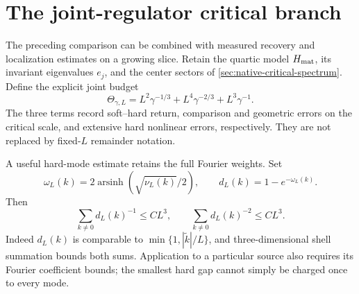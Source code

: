 \documentclass[11pt,oneside,openany]{book}
\theoremstyle{definition}
\theoremstyle{remark}
\begin{document}
\section{The joint-regulator critical branch}
\label{sec:native-joint-regulator}
The preceding comparison can be combined with measured recovery and
localization estimates on a growing slice. Retain the quartic model
$H_{\rm mat}$, its invariant eigenvalues $e_j$, and the center sectors
of \cref{sec:native-critical-spectrum}. Define the explicit joint budget
\begin{equation}
 \Theta_{\gamma,L}
    =L^2\gamma^{-1/3}+L^4\gamma^{-2/3}+L^3\gamma^{-1}.
 \label{eq:native-joint-budget}
\end{equation}
The three terms record soft--hard return, comparison and geometric
errors on the critical scale, and extensive hard nonlinear errors,
respectively. They are not replaced by fixed-$L$ remainder notation.

A useful hard-mode estimate retains the full Fourier weights. Set
\[
 \omega_L(k)=2\operatorname{arsinh}(\sqrt{\nu_L(k)}/2),
 \qquad d_L(k)=1-e^{-\omega_L(k)}.
\]
Then
\begin{equation}
 \sum_{k\ne0}d_L(k)^{-1}\le CL^3,
 \qquad \sum_{k\ne0}d_L(k)^{-2}\le CL^3.
 \label{eq:native-hard-susceptibilities}
\end{equation}
Indeed $d_L(k)$ is comparable to
$\min\{1,|\widetilde k|/L\}$, and three-dimensional shell summation
bounds both sums. Application to a particular source also requires its
Fourier coefficient bounds; the smallest hard gap cannot simply be
charged once to every mode.
\end{document}
